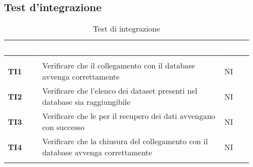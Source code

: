 \subsection{Test d'integrazione}
{

\renewcommand{\arraystretch}{1.5}
\renewcommand\extrarowheight{1.5pt}
\setlength\arrayrulewidth{1pt}
\begin{longtable}{ C{1.5cm} | C{12cm}| C{1.5cm} } 
		\textcolor{white}{\textbf{Codice}} & 
		\textcolor{white}{\textbf{Descrizione}} & 
		\textcolor{white}{\textbf{Stato}} \\
		\endfirsthead
		\\
	    \endfoot
	    \endlastfoot

\textbf{TI1} & 
Verificare che il collegamento con il database avvenga correttamente & 
NI\\

\textbf{TI2} & 
Verificare che l'elenco dei dataset presenti nel database sia raggiungibile & 
NI\\

\textbf{TI3} & 
Verificare che le  per il recupero dei dati avvengano con successo & 
NI\\

\textbf{TI4} & 
Verificare che la chiusura del collegamento con il database avvenga correttamente & 
NI\\

\caption{Test di integrazione}
\label{testIntegrazione}
\end{longtable}
}
